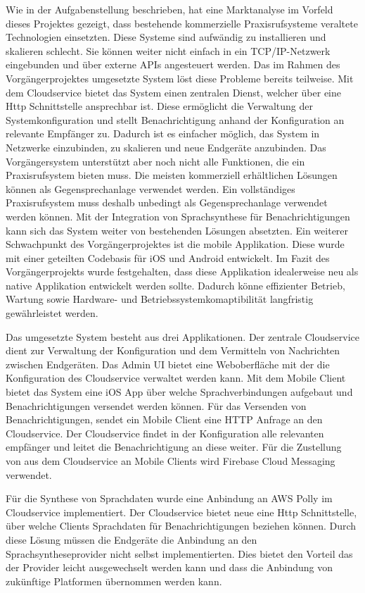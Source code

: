 Wie in der Aufgabenstellung beschrieben, hat eine Marktanalyse im Vorfeld dieses Projektes gezeigt, dass bestehende kommerzielle Praxisrufsysteme veraltete Technologien einsetzten.
Diese Systeme sind aufwändig zu installieren und skalieren schlecht.
Sie können weiter nicht einfach in ein TCP/IP-Netzwerk eingebunden und über externe APIs angesteuert werden.\cite{aufgabenstellung}
Das im Rahmen des Vorgängerprojektes umgesetzte System löst diese Probleme bereits teilweise.
Mit dem Cloudservice bietet das System einen zentralen Dienst, welcher über eine Http Schnittstelle ansprechbar ist.
Diese ermöglicht die Verwaltung der Systemkonfiguration und stellt Benachrichtigung anhand der Konfiguration an relevante Empfänger zu.
Dadurch ist es einfacher möglich, das System in Netzwerke einzubinden, zu skalieren und neue Endgeräte anzubinden.
Das Vorgängersystem unterstützt aber noch nicht alle Funktionen, die ein Praxisrufsystem bieten muss.
Die meisten kommerziell erhältlichen Lösungen können als Gegensprechanlage verwendet werden\cite{aufgabenstellung}.
Ein vollständiges Praxisrufsystem muss deshalb unbedingt als Gegensprechanlage verwendet werden können.
Mit der Integration von Sprachsynthese für Benachrichtigungen kann sich das System weiter von bestehenden Lösungen absetzten.
Ein weiterer Schwachpunkt des Vorgängerprojektes ist die mobile Applikation.
Diese wurde mit einer geteilten Codebasis für iOS und Android entwickelt.
Im Fazit des Vorgängerprojekts wurde festgehalten, dass diese Applikation idealerweise neu als native Applikation entwickelt werden sollte.
Dadurch könne effizienter Betrieb, Wartung sowie Hardware- und Betriebssystemkomaptibilität langfristig gewährleistet werden.\cite{ip5}

Das umgesetzte System besteht aus drei Applikationen.
Der zentrale Cloudservice dient zur Verwaltung der Konfiguration und dem Vermitteln von Nachrichten zwischen Endgeräten.
Das Admin UI bietet eine Weboberfläche mit der die Konfiguration des Cloudservice verwaltet werden kann.
Mit dem Mobile Client bietet das System eine iOS App über welche Sprachverbindungen aufgebaut und Benachrichtigungen versendet werden können.
Für das Versenden von Benachrichtigungen, sendet ein Mobile Client eine HTTP Anfrage an den Cloudservice.
Der Cloudservice findet in der Konfiguration alle relevanten empfänger und leitet die Benachrichtigung an diese weiter.
Für die Zustellung von aus dem Cloudservice an Mobile Clients wird Firebase Cloud Messaging verwendet.

Für die Synthese von Sprachdaten wurde eine Anbindung an AWS Polly im Cloudservice implementiert.
Der Cloudservice bietet neue eine Http Schnittstelle, über welche Clients Sprachdaten für Benachrichtigungen beziehen können.
Durch diese Lösung müssen die Endgeräte die Anbindung an den Sprachsyntheseprovider nicht selbst implementierten.
Dies bietet den Vorteil das der Provider leicht ausgewechselt werden kann und dass die Anbindung von zukünftige Platformen übernommen werden kann.

